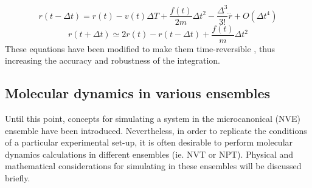 %
%
%
%
\begin{equation}
r(t - \Delta t) = r(t) - v(t) \Delta T + \frac{f(t)}{2m} \Delta t^{2} - \frac{\Delta^{3}}{3!} \dddot{r} + O(\Delta t^{4}) 
\end{equation}
%
%
%
%
\begin{equation}
r(t + \Delta t) \simeq 2r(t) - r(t - \Delta t) + \frac{f(t)}{m} \Delta t^{2}
\end{equation}
%
%
These equations have been modified to make them time-reversible \cite{Martyna:1996aa}, thus increasing the accuracy and robustness of the integration. 

\subsection{Molecular dynamics in various ensembles}
Until this point, concepts for simulating a system in the microcanonical (NVE) ensemble have been introduced. Nevertheless, in order to replicate the conditions of a particular experimental set-up, it is often desirable to perform molecular dynamics calculations in different ensembles (ie. NVT or NPT). Physical and mathematical considerations for simulating in these ensembles will be discussed briefly.


